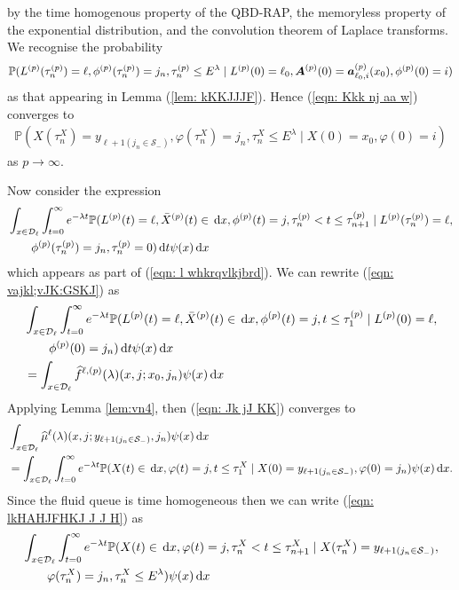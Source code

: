 by the time homogenous property of the QBD-RAP, the memoryless property of the exponential distribution, and the convolution theorem of Laplace transforms. We recognise the probability 
\begin{align}
	\mathbb P(L^{(p)}(\tau_n^{(p)}) = \ell, \phi^{(p)}(\tau_n^{(p)}) = j_n, \tau_{n}^{(p)}\leq E^\lambda 
	 \mid L^{(p)}(0)=\ell_0, \boldsymbol A^{(p)}(0)=\boldsymbol  a_{\ell_0,i}^{(p)}(x_0), \phi^{(p)}(0)=i) \label{eqn: Kkk nj aa w}
\end{align}
as that appearing in Lemma (\ref{lem: kKKJJJF}). Hence (\ref{eqn: Kkk nj aa w}) converges to 
\begin{align}
	\mathbb P(X(\tau_n^X) = y_{\ell+1(j_{n}\in\mathcal S_-)}, 
		\varphi(\tau_n^X) = j_n, \tau_{n}^X\leq E^\lambda
		\mid X(0)=x_0, \varphi(0)=i)
\end{align}
as \(p\to\infty\). 

Now consider the expression 
\begin{align}
	&\int_{x\in\mathcal{D}_\ell} \int_{t=0}^\infty e^{-\lambda t} \mathbb P(L^{(p)}(t) = \ell, \bar X^{(p)}(t) \in \, \mathrm{d} x, \phi^{(p)}(t) = j, 
	\tau_n^{(p)}<t \leq \tau_{n+1}^{(p)} \mid L^{(p)}(\tau_n^{(p)}) = \ell, \nonumber 
	 \\&\qquad{} \phi^{(p)}(\tau_n^{(p)}) = j_n,
	 	\tau_{n}^{(p)}= 0)\, \mathrm{d} t  \psi(x)\, \mathrm{d} x \label{eqn: vajkl;vJK:GSKJ}
\end{align}
which appears as part of (\ref{eqn: l whkrqvlkjbrd}). We can rewrite (\ref{eqn: vajkl;vJK:GSKJ}) as  
\begin{align}
	 &\int_{x\in\mathcal{D}_\ell} \int_{t=0}^\infty e^{-\lambda t} \mathbb P(L^{(p)}(t) = \ell, \bar X^{(p)}(t) \in \, \mathrm{d} x, \phi^{(p)}(t) = j, 
	t \leq \tau_{1}^{(p)} \mid L^{(p)}(0) = \ell, \nonumber 
	 \\&\qquad{} \phi^{(p)}(0) = j_n)\, \mathrm{d} t \psi(x)\, \mathrm{d} x\nonumber 
	 \\&= \int_{x\in\mathcal{D}_\ell} \widehat f^{\ell,(p)} (\lambda)(x,j;x_0,j_n) \psi(x)\, \mathrm{d} x \label{eqn: Jk jJ KK}
\end{align}
Applying Lemma \ref{lem:vn4}, then (\ref{eqn: Jk jJ KK}) converges to 
\begin{align}
	&\int_{x\in\mathcal{D}_\ell} \widehat \mu^{\ell} (\lambda)(x,j;y_{\ell+1(j_n\in\mathcal S_-)},j_n) \psi(x)\, \mathrm{d} x \nonumber 
	\\&= \int_{x\in\mathcal{D}_\ell} \int_{t=0}^\infty e^{-\lambda t}\mathbb P(X(t)\in\, \mathrm{d} x, \varphi(t)=j, t\leq \tau_1^X \mid X(0) = y_{\ell+1(j_n\in\mathcal S_-)}, \varphi(0)=j_n ) \psi(x)\, \mathrm{d} x. \label{eqn: lkHAHJFHKJ J J H}
\end{align}
Since the fluid queue is time homogeneous then we can write (\ref{eqn: lkHAHJFHKJ J J H}) as 
\begin{align}
	&\int_{x\in\mathcal{D}_\ell} \int_{t=0}^\infty e^{-\lambda t} \mathbb P(X(t)\in\, \mathrm{d} x, \varphi(t)=j, \tau_n^X < t \leq \tau_{n+1}^X \mid X(\tau_n^X) = y_{\ell+1(j_n\in\mathcal S_-)}, \nonumber 
	\\&\qquad{} \varphi(\tau_n^X)=j_n, \tau_n^X\leq E^\lambda ) \psi(x)\, \mathrm{d} x \label{eqn: lkHAHJFHKJ J J 22}
\end{align}

